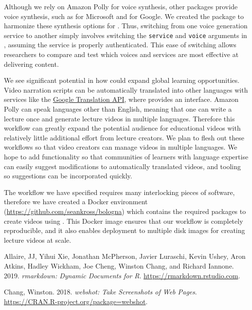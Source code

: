 Although we rely on Amazon Polly for voice synthesis, other packages
provide voice synthesis, such as  for Microsoft and
 for Google. We created the 
package to harmonize these synthesis options for . Thus,
switching from one voice generation service to another simply involves
switching the \texttt{service} and \texttt{voice} arguments in
, assuming the service is properly authenticated. This ease of
switching allows researchers to compare and test which voices and
services are most effective at delivering content.

We see significant potential in how  could expand global
learning opportunities. Video narration scripts can be automatically
translated into other languages with services like the
\href{https://cloud.google.com/translate/docs/}{Google Translation API},
where  provides an interface. Amazon Polly can
speak languages other than English, meaning that one can write a lecture
once and generate lecture videos in multiple languages. Therefore this
workflow can greatly expand the potential audience for educational
videos with relatively little additional effort from lecture creators.
We plan to flesh out these workflows so that video creators can manage
videos in multiple languages. We hope to add functionality so that
communities of learners with language expertise can easily suggest
modifications to automatically translated videos, and tooling so
suggestions can be incorporated quickly.

The workflow we have specified requires many interlocking pieces of
software, therefore we have created a Docker environment
(\url{https://github.com/seankross/bologna}) which contains the required
packages to create videos using . This Docker image ensures
that our workflow is completely reproducible, and it also enables
deployment to multiple disk images for creating lecture videos at scale.



\hypertarget{refs}{}
\leavevmode\hypertarget{ref-rmarkdown}{}%
Allaire, JJ, Yihui Xie, Jonathan McPherson, Javier Luraschi, Kevin
Ushey, Aron Atkins, Hadley Wickham, Joe Cheng, Winston Chang, and
Richard Iannone. 2019. \emph{rmarkdown: Dynamic Documents for R}.
\url{https://rmarkdown.rstudio.com}.

\leavevmode\hypertarget{ref-webshot}{}%
Chang, Winston. 2018. \emph{webshot: Take Screenshots of Web Pages}.
\url{https://CRAN.R-project.org/package=webshot}.

